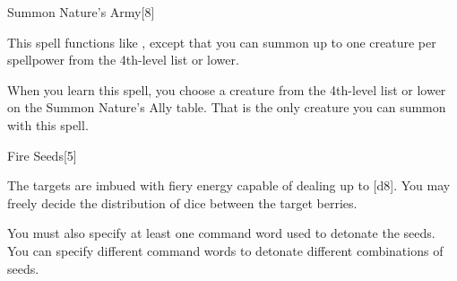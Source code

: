 \begin{spellfooter}
\begin{spellsection}{Summon Nature's Army}[8]
    \begin{spellheader}
    \end{spellheader}
    \begin{spellcontent}
        \begin{spelltargetinginfo}
        \end{spelltargetinginfo}
        \begin{spelleffects}
            \spellspecial This spell functions like , except that you can summon up to one creature per spellpower from the 4th-level list or lower.
            \par When you learn this spell, you choose a creature from the 4th-level list or lower on the Summon Nature's Ally table. That is the only creature you can summon with this spell.
            \spelldur \durshort \dismissable
        \end{spelleffects}
    \end{spellcontent}
    \begin{spellfooter}
        \miscastexplode
    \end{spellfooter}
\end{spellsection}

\begin{spellsection}{Fire Seeds}[5]
    \begin{spellheader}
    \end{spellheader}
    \begin{spellcontent}
        \begin{spelltargetinginfo}
        \end{spelltargetinginfo}
        \begin{spelleffects}
            \spelleffect The targets are imbued with fiery energy capable of dealing up to [d8]. You may freely decide the distribution of dice between the target berries.

            You must also specify at least one command word used to detonate the seeds. You can specify different command words to detonate different combinations of seeds.


\end{spelleffects}
\end{spellcontent}
\end{spellsection}
\end{spellfooter}
